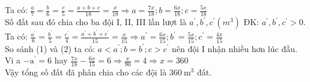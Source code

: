 \begin{bt}
{\begin{enumerate}
Ta có: $\frac{a}{7}=\frac{b}{6}=\frac{c}{5}=\frac{a+b+c}{18}=\frac{x}{18} \Rightarrow a=\frac{7 x}{18} ; b=\frac{6 x}{18} ; c=\frac{5 x}{18}$\\[5px]
Số đất sau đó chia cho ba đội I, II, III lần lượt là $a^{\prime}, b^{\prime}, c^{\prime}\left(m^3\right)$ ĐK: $a^{\prime}, b^{\prime}, c^{\prime}>0$.\\[5px]
Ta có: $\frac{a^{\prime}}{6}=\frac{b^{\prime}}{5}=\frac{c^{\prime}}{4}=\frac{a^{\prime}+b^{\prime}+c^{\prime}}{15}=\frac{x}{15} \Rightarrow a^{\prime}=\frac{6 x}{15} ; b^{\prime}=\frac{5 x}{15} ; c^{\prime}=\frac{4 x}{15}$\\[5px]
So sánh (1) và (2) ta có: $a<a^{\prime} ; b=b^{\prime} ; c>c^{\prime}$ nên đội I nhận nhiều hơn lúc đầu.\\[5px]
Vi a $-\mathrm{a}^{\prime}=6$ hay $\frac{7 x}{18}-\frac{6 x}{15}=6 \Rightarrow \frac{x}{90}=4 \Rightarrow x=360$\\[5px]
Vậy tổng số đất đã phân chia cho các đội là $360 \mathrm{~m}^3$ đất.
    \end{enumerate}
} 
\end{bt}

